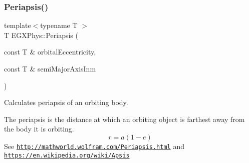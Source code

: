 \subsubsection{\texorpdfstring{Periapsis()}{Periapsis()}}
{\footnotesize\ttfamily template$<$typename T $>$ \\
T E\+G\+X\+Phys\+::\+Periapsis (\begin{DoxyParamCaption}\item[{const T \&}]{orbital\+Eccentricity,  }\item[{const T \&}]{semi\+Major\+Axis\+Inm }\end{DoxyParamCaption})}



Calculates periapsis of an orbiting body. 

The periapsis is the distance at which an orbiting object is farthest away from the body it is orbiting. \[r=a(1-e)\] See \href{http://mathworld.wolfram.com/Periapsis.html}{\tt http\+://mathworld.\+wolfram.\+com/\+Periapsis.\+html} and \href{https://en.wikipedia.org/wiki/Apsis}{\tt https\+://en.\+wikipedia.\+org/wiki/\+Apsis}


